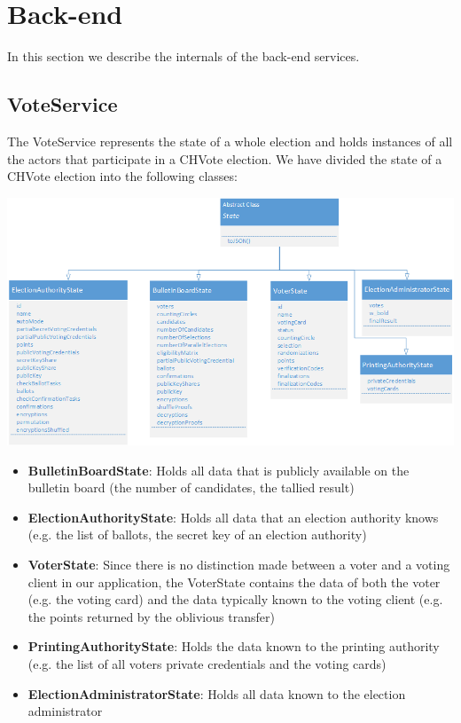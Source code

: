 \section{Back-end}
In this section we describe the internals of the back-end services. 
\subsection{VoteService}
The VoteService represents the state of a whole election and holds instances of all the actors that participate in a CHVote election. We have divided the state of a CHVote election into the following classes:

\begin{center}
\includegraphics[scale=0.62]{assets/stateClasses.png}
\label{State classes}%
\end{center}

\begin{itemize}
	\item \textbf{BulletinBoardState}: Holds all data that is publicly available on the bulletin board (the number of candidates, the tallied result)
	\item \textbf{ElectionAuthorityState}: Holds all data that an election authority knows (e.g. the list of ballots, the secret key of an election authority)
	\item \textbf{VoterState}: Since there is no distinction made between a voter and a voting client in our application, the VoterState contains the data of both the voter (e.g. the voting card) and the data typically known to the voting client (e.g. the points returned by the oblivious transfer)
	\item \textbf{PrintingAuthorityState}: Holds the data known to the printing authority (e.g. the list of all voters private credentials and the voting cards)
	\item \textbf{ElectionAdministratorState}: Holds all data known to the election administrator 
\end{itemize}

